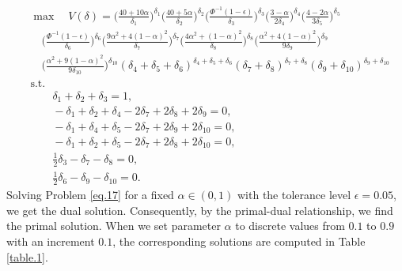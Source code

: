 \begin{equation}\label{eq.17}
	\begin{aligned}
		&\max \quad V(\delta)=\bigg(\frac{40+10\alpha}{{\delta_{1}}}\bigg)^{{\delta_{1}}}\bigg(\frac{40+5\alpha}{{\delta_{2}}}\bigg)^{{\delta_{2}}} \bigg(\frac{\Phi^{-1}(1-\epsilon)}{{\delta_{3}}}\bigg)^{{\delta_{3}}}\bigg(\frac{3-\alpha}{{2\delta_{4}}}\bigg)^{{\delta_{4}}}\bigg(\frac{4-2\alpha}{{3\delta_{5}}}\bigg)^{{\delta_{5}}} \\ 
		& \quad
		\bigg(\frac{\Phi^{-1}(1-\epsilon)}{{\delta_{6}}}\bigg)^{{\delta_{6}}}
		\bigg(\frac{9\alpha^2+4(1-\alpha)^2}{{\delta_{7}}}\bigg)^{{\delta_{7}}} \bigg(\frac{4\alpha^2+(1-\alpha)^2}{{\delta_{8}}}\bigg)^{{\delta_{8}}}
		\bigg(\frac{\alpha^2+4(1-\alpha)^2}{{9\delta_{9}}}\bigg)^{{\delta_{9}}}\\
		& \quad
		\bigg(\frac{\alpha^2+9(1-\alpha)^2}{{9\delta_{10}}}\bigg)^{{\delta_{10}}}(\delta_{4}+\delta_{5}+\delta_{6})^{\delta_{4}+\delta_{5}+\delta_{6}} (\delta_{7}+\delta_{8})^{\delta_{7}+\delta_{8}} (\delta_{9}+\delta_{10})^{\delta_{9}+\delta_{10}}\\
		&\text{s.t.}\\
		& \qquad \delta_1+\delta_{2}+\delta_{3}=1, \\
		&\qquad -\delta_{1}+\delta_{2}+\delta_{4}-2\delta_{7}+2\delta_{8}+2\delta_{9}=0,\\
		&\qquad -\delta_{1}+\delta_{4}+\delta_{5}-2\delta_{7}+2\delta_{9}+2\delta_{10}=0,\\
		&\qquad -\delta_{1}+\delta_{2}+\delta_{5}-2\delta_{7}+2\delta_{8}+2\delta_{10}=0,\\
		&\qquad \frac{1}{2}\delta_{3}-\delta_{7}-\delta_{8}=0, \\
		&\qquad \frac{1}{2}\delta_{6}-\delta_{9}-\delta_{10}=0.
	\end{aligned}
\end{equation}
Solving Problem \ref{eq.17} for a fixed $\alpha \in (0,1)$ with the tolerance level $\epsilon=0.05$, we get the dual solution. Consequently, by the primal-dual relationship, we find the primal solution. When we set parameter $\alpha$ to discrete values from $0.1$ to $0.9$ with an increment $0.1$, the corresponding solutions are computed in Table \ref{table.1}. \\
